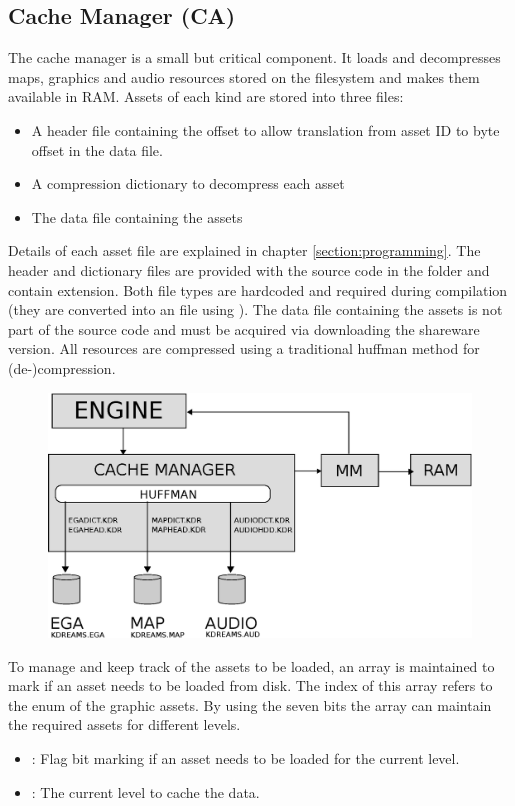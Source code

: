 \documentclass[book.tex]{subfiles}
\begin{document}
\subsection{Cache Manager (CA)}
The cache manager is a small but critical component. It loads and decompresses maps, graphics and audio resources stored on the filesystem and makes them available in RAM. Assets of each kind are stored into three files: 
\begin{itemize}
	\item A header file containing the offset to allow translation from asset ID to byte offset in the data file.
	\item A compression dictionary to decompress each asset
	\item The data file containing the assets
\end{itemize}
 \par
 
Details of each asset file are explained in chapter \ref{section:programming}. The header and dictionary files are provided with the source code in the  folder and contain  extension. Both file types are hardcoded and required during compilation (they are converted into an  file using ). The data file containing the assets is not part of the source code and must be acquired via downloading the shareware version.
 All resources are compressed using a traditional huffman method for (de-)compression. \\
 \par
\begin{figure}[H]
\centering
 \includegraphics[width=\textwidth]{imgs/drawings/cache_manager_architecture.eps}
 \end{figure}
\pagebreak


To manage and keep track of the assets to be loaded, an array  is maintained to mark if an asset needs to be loaded from disk. The index of this array refers to the enum of the graphic assets. By using the seven bits the array can maintain the required assets for different levels.
\begin{itemize}
  \item {} : Flag bit marking if an asset needs to be loaded for the current level.
  \item {} : The current level to cache the data. 
\end{itemize}
\end{document}
